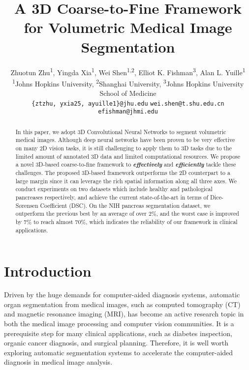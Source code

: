 \documentclass[10pt,twocolumn,letterpaper]{article}
\begin{document}
\title{A 3D Coarse-to-Fine Framework for Volumetric Medical Image Segmentation}

\author{Zhuotun Zhu\textsuperscript{1}, Yingda Xia\textsuperscript{1},
Wei Shen\textsuperscript{1,2}, Elliot K. Fishman\textsuperscript{3}, Alan L. Yuille\textsuperscript{1} \\
\textsuperscript{1}Johns Hopkins University, 
\textsuperscript{2}Shanghai University, 
\textsuperscript{3}Johns Hopkins University School of Medicine\\
{\tt\small \{ztzhu, yxia25, ayuille1\}@jhu.edu}\quad
{\tt\small wei.shen@t.shu.edu.cn}\quad
{\tt\small efishman@jhmi.edu}\quad \\
}

\maketitle

\begin{abstract}
	In this paper, we adopt 3D Convolutional Neural Networks to segment volumetric medical images. Although deep neural networks have been proven to be very effective on many 2D vision tasks, it is still challenging to apply them to 3D tasks due to the limited amount of annotated 3D data and limited computational resources. We propose a novel 3D-based coarse-to-fine framework to {\bf\textit{effectively}} and {\bf\textit{efficiently}} tackle these challenges. The proposed 3D-based framework outperforms the 2D counterpart to a large margin since it can leverage the rich spatial information along all three axes. We conduct experiments on two datasets which include healthy and pathological pancreases respectively, and achieve the current state-of-the-art in terms of Dice-S{\o}rensen Coefficient (DSC). On the NIH pancreas segmentation dataset, we outperform the previous best by an average of over $2\%$, and the worst case is improved by $7\%$ to reach almost $70\%$, which indicates the reliability of our framework in clinical applications.
\end{abstract}

\section{Introduction}
Driven by the huge demands for computer-aided diagnosis systems, automatic organ segmentation from medical images, such as computed tomography (CT) and magnetic resonance imaging (MRI), has become an active research topic in both the medical image processing and computer vision communities. It is a prerequisite step for many clinical applications, such as diabetes inspection, organic cancer diagnosis, and surgical planning. Therefore, it is well worth exploring automatic segmentation systems to accelerate the computer-aided diagnosis in medical image analysis.
\end{document}
